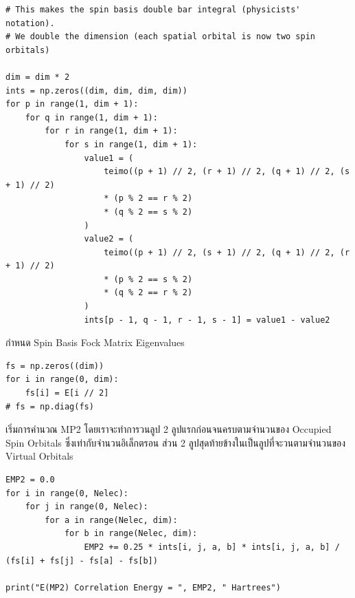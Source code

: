 \begin{lstlisting}[style=MyPython]
# This makes the spin basis double bar integral (physicists' notation).
# We double the dimension (each spatial orbital is now two spin orbitals)

dim = dim * 2
ints = np.zeros((dim, dim, dim, dim))
for p in range(1, dim + 1):
    for q in range(1, dim + 1):
        for r in range(1, dim + 1):
            for s in range(1, dim + 1):
                value1 = (
                    teimo((p + 1) // 2, (r + 1) // 2, (q + 1) // 2, (s + 1) // 2)
                    * (p % 2 == r % 2)
                    * (q % 2 == s % 2)
                )
                value2 = (
                    teimo((p + 1) // 2, (s + 1) // 2, (q + 1) // 2, (r + 1) // 2)
                    * (p % 2 == s % 2)
                    * (q % 2 == r % 2)
                )
                ints[p - 1, q - 1, r - 1, s - 1] = value1 - value2
\end{lstlisting}

\vspace{5pt}

\noindent กำหนด Spin Basis Fock Matrix Eigenvalues

\vspace{5pt}

\begin{lstlisting}[style=MyPython]
fs = np.zeros((dim))
for i in range(0, dim):
    fs[i] = E[i // 2]
# fs = np.diag(fs)
\end{lstlisting}

\vspace{5pt}

\noindent เริ่มการคำนวณ MP2 โดยเราจะทำการวนลูป 2 ลูปแรกก่อนจนครบตามจำนวนของ Occupied Spin Orbitals ซึ่งเท่ากับจำนวนอิเล็กตรอน ส่วน 2 ลูปสุดท้ายข้างในเป็นลูปที่จะวนตามจำนวนของ Virtual Orbitals

\vspace{5pt}

\begin{lstlisting}[style=MyPython]
EMP2 = 0.0
for i in range(0, Nelec):
    for j in range(0, Nelec):
        for a in range(Nelec, dim):
            for b in range(Nelec, dim):
                EMP2 += 0.25 * ints[i, j, a, b] * ints[i, j, a, b] / (fs[i] + fs[j] - fs[a] - fs[b])

print("E(MP2) Correlation Energy = ", EMP2, " Hartrees")
\end{lstlisting}

\vspace{5pt}

